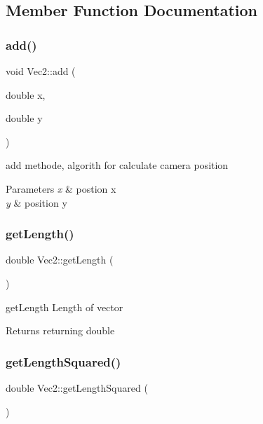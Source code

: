 \subsection{Member Function Documentation}
\mbox{\label{classVec2_a591966ea1b13cf9333e57999e4953465}} 
\subsubsection{\texorpdfstring{add()}{add()}}
{\footnotesize\ttfamily void Vec2\+::add (\begin{DoxyParamCaption}\item[{double}]{x,  }\item[{double}]{y }\end{DoxyParamCaption})}



add methode, algorith for calculate camera position 


\begin{DoxyParams}{Parameters}
{\em x} & postion x \\
\hline
{\em y} & position y \\
\hline
\end{DoxyParams}
\mbox{\label{classVec2_a0cf7a6aad8f6b48805455f31a69feb5d}} 
\subsubsection{\texorpdfstring{get\+Length()}{getLength()}}
{\footnotesize\ttfamily double Vec2\+::get\+Length (\begin{DoxyParamCaption}{ }\end{DoxyParamCaption})}



get\+Length Length of vector 

\begin{DoxyReturn}{Returns}
returning double 
\end{DoxyReturn}
\mbox{\label{classVec2_a229954458b6789250afb7f6af143002c}} 
\subsubsection{\texorpdfstring{get\+Length\+Squared()}{getLengthSquared()}}
{\footnotesize\ttfamily double Vec2\+::get\+Length\+Squared (\begin{DoxyParamCaption}{ }\end{DoxyParamCaption})}



